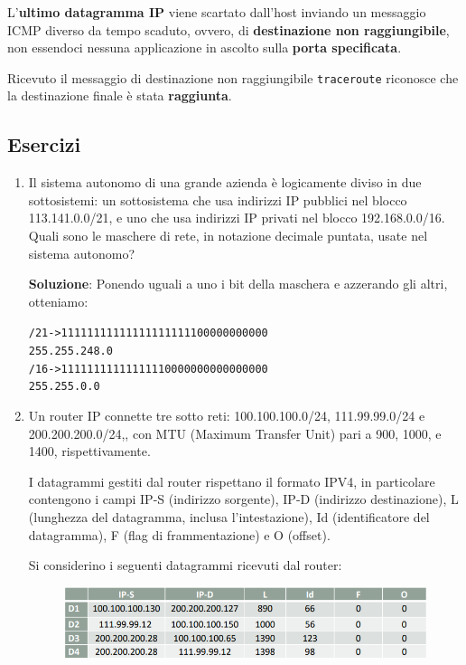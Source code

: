 \documentclass[11pt,a4paper,oneside]{book}
\theoremstyle{definition}
\begin{document}
\begin{itemize}
	      L'\textbf{ultimo datagramma IP} viene scartato dall'host inviando un messaggio ICMP diverso da tempo scaduto, ovvero, di \textbf{destinazione non raggiungibile}, non essendoci nessuna applicazione in ascolto sulla \textbf{porta specificata}.

	      Ricevuto il messaggio di destinazione non raggiungibile \texttt{traceroute} riconosce che la destinazione finale è stata \textbf{raggiunta}.

\end{itemize}

\subsection{Esercizi}
\begin{enumerate}
	\item Il sistema autonomo di una grande azienda è logicamente diviso in due sottosistemi: un sottosistema che usa indirizzi IP pubblici nel blocco 113.141.0.0/21, e uno che usa indirizzi IP privati nel blocco 192.168.0.0/16. Quali sono le maschere di rete, in notazione decimale puntata, usate nel sistema autonomo?

	      \textbf{Soluzione}: Ponendo uguali a uno i bit della maschera e azzerando gli altri, otteniamo:
	      \begin{alltt}
		      \centering
		      /21 -> 11111111 11111111 11111000 00000000
		      255.255. 248.0
		      /16 -> 11111111 11111111 00000000 00000000
		      255.255.0.0
	      \end{alltt}

	\item Un router IP connette tre sotto reti: 100.100.100.0/24, 111.99.99.0/24 e
	      200.200.200.0/24,, con MTU (Maximum Transfer Unit) pari a 900, 1000, e
	      1400, rispettivamente.

	      I datagrammi gestiti dal router rispettano il formato IPV4, in particolare
	      contengono i campi IP-S (indirizzo sorgente), IP-D (indirizzo destinazione), L
	      (lunghezza del datagramma, inclusa l’intestazione), Id (identificatore del
	      datagramma), F (flag di frammentazione) e O (offset).

	      Si considerino i seguenti datagrammi ricevuti dal router:
	      \begin{figure}[!h]
		      \includegraphics[scale=0.4]{Immagini/Ip_es2.png}
		      \centering
	      \end{figure}


\end{enumerate}
\end{document}
